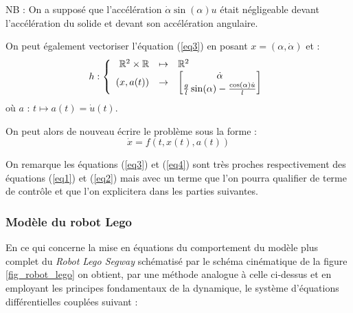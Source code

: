 \documentclass[a4paper]{article}
\begin{document}
                                NB : On a supposé que l'accélération $\dot \alpha \sin(\alpha)u$ était négligeable devant l'accélération du solide
                                et devant son accélération angulaire.


                                On peut également vectoriser l'équation (\ref{eq3}) en posant $x=(\alpha, \dot \alpha)$ et : $$h : \vspace{15pt} \left\{
                                \begin{array}{rcl}
                                        \mathbb{R}^2 \times \mathbb{R} & \mapsto & \mathbb{R}^2 \\
                                        (x,a(t)) & \to & \begin{bmatrix} \dot \alpha \\ \frac{g}{l} \sin (\alpha) - \frac{\cos (\alpha) \dot u}{l}\end{bmatrix}
                                \end{array} \right.$$
                                où $a$ : $t \mapsto a(t) = \dot u(t)$.

                                On peut alors de nouveau écrire le problème sous la forme :
                                \begin{equation}
                                        \dot x = f(t,x(t),a(t))
                                        \label{eq4}
                                \end{equation}

                                On remarque les équations (\ref{eq3}) et (\ref{eq4}) sont très proches respectivement
                                des équations (\ref{eq1}) et (\ref{eq2}) mais avec un terme que l'on pourra qualifier de terme
                                de contrôle et que l'on explicitera dans les parties suivantes.


                        \subsubsection{Modèle du robot Lego}

                                En ce qui concerne la mise en équations du comportement du modèle plus complet du \textit{Robot Lego Segway}
                                schématisé par le schéma cinématique de la figure \ref{fig_robot_lego} 
                                on obtient, par une méthode analogue à celle ci-dessus et en employant les principes fondamentaux de la dynamique,
                                le système d'équations différentielles couplées suivant : 
                                
\end{document}
